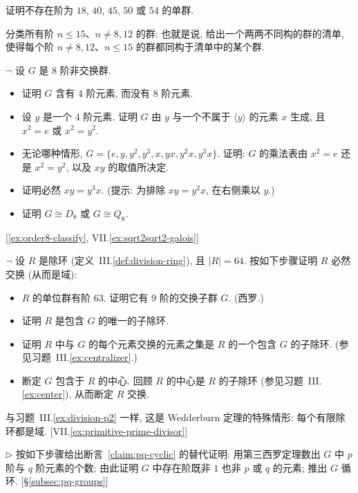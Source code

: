 \begin{prob}
\label{ex:no-simple-18-etc}
证明不存在阶为 $18$, $40$, $45$, $50$ 或 $54$ 的单群.
\end{prob}

\begin{prob}
\label{ex:classify-up-to-15}
分类所有阶 $n \leq 15$、$n \neq 8, 12$ 的群: 也就是说, 给出一个两两不同构的群的清单, 使得每个阶 $n \neq 8, 12$、$n \leq 15$ 的群都同构于清单中的某个群.
\end{prob}

\begin{prob}
\label{ex:order-8}
$\neg$ 设 $G$ 是 $8$ 阶非交换群.
\begin{itemize}
	\item 证明 $G$ 含有 $4$ 阶元素, 而没有 $8$ 阶元素.
	\item 设 $y$ 是一个 $4$ 阶元素. 证明 $G$ 由 $y$ 与一个不属于 $\langle y \rangle$ 的元素 $x$ 生成, 且 $x^2 = e$ 或 $x^2 = y^2$.
	\item 无论哪种情形, $G = \{e, y, y^2, y^3, x, yx, y^2x, y^3x\}$. 证明: $G$ 的乘法表由 $x^2 = e$ 还是 $x^2 = y^2$, 以及 $xy$ 的取值所决定.
	\item 证明必然 $xy = y^3x$. (提示: 为排除 $xy = y^2 x$, 在右侧乘以 $y$.)
	\item 证明 $G \cong D_8$ 或 $G \cong Q_8$.
\end{itemize}
[\ref{ex:order8-classify}, VII.\ref{ex:sqrt2sqrt2-galois}]
\end{prob}

\begin{prob}
\label{ex:wedderburn-64}
$\neg$ 设 $R$ 是除环 (定义~III.\ref{def:division-ring}), 且 $|R| = 64$. 按如下步骤证明 $R$ 必然交换 (从而是域):
\begin{itemize}
	\item $R$ 的单位群有阶 $63$. 证明它有 $9$ 阶的交换子群 $G$. (西罗.)
	\item 证明 $R$ 是包含 $G$ 的唯一的子除环.
	\item 证明 $R$ 中与 $G$ 的每个元素交换的元素之集是 $R$ 的一个包含 $G$ 的子除环. (参见习题~III.\ref{ex:centralizer}.)
	\item 断定 $G$ 包含于 $R$ 的中心. 回顾 $R$ 的中心是 $R$ 的子除环 (参见习题~III.\ref{ex:center}), 从而断定 $R$ 交换.
\end{itemize}
与习题~III.\ref{ex:division-p2} 一样, 这是 Wedderburn 定理的特殊情形: 每个有限除环都是域. [VII.\ref{ex:primitive-prime-divisor}]
\end{prob}

\begin{prob}
\label{ex:pq-cyclic-alt}
$\triangleright$ 按如下步骤给出断言~\ref{claim:pq-cyclic} 的替代证明: 用第三西罗定理数出 $G$ 中 $p$ 阶与 $q$ 阶元素的个数; 由此证明 $G$ 中存在阶既非 $1$ 也非 $p$ 或 $q$ 的元素; 推出 $G$ 循环. [\S\ref{subsec:pq-groups}]
\end{prob}

